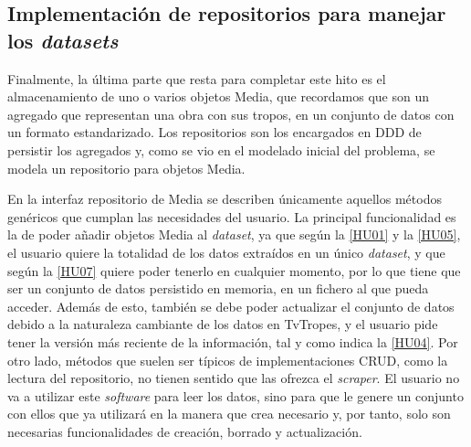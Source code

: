 \subsection{Implementación de repositorios para manejar los \textit{datasets}}
Finalmente, la última parte que resta para completar este hito es el
almacenamiento de uno o varios objetos Media, que recordamos que son un agregado
que representan una obra con sus tropos, en un conjunto de datos con un formato
estandarizado. Los repositorios son los encargados en DDD de persistir los
agregados y, como se vio en el modelado inicial del problema, se modela un
repositorio para objetos Media.

En la interfaz repositorio de Media se describen únicamente aquellos métodos
genéricos que cumplan las necesidades del usuario. La principal funcionalidad es
la de poder añadir objetos Media al \textit{dataset}, ya que según la
\href{https://github.com/jlgallego99/TropesToGo/issues/6}{[HU01]} y la
\href{https://github.com/jlgallego99/TropesToGo/issues/30}{[HU05]}, el usuario
quiere la totalidad de los datos extraídos en un único \textit{dataset}, y que
según la \href{https://github.com/jlgallego99/TropesToGo/issues/46}{[HU07]}
quiere poder tenerlo en cualquier momento, por lo que tiene que ser un conjunto
de datos persistido en memoria, en un fichero al que pueda acceder. Además de
esto, también se debe poder actualizar el conjunto de datos debido a la
naturaleza cambiante de los datos en TvTropes, y el usuario pide tener la
versión más reciente de la información, tal y como indica la
\href{https://github.com/jlgallego99/TropesToGo/issues/9}{[HU04]}. Por otro
lado, métodos que suelen ser típicos de implementaciones CRUD, como la lectura
del repositorio, no tienen sentido que las ofrezca el \textit{scraper}. El
usuario no va a utilizar este \textit{software} para leer los datos, sino para
que le genere un conjunto con ellos que ya utilizará en la manera que crea
necesario y, por tanto, solo son necesarias funcionalidades de creación, borrado
y actualización.

